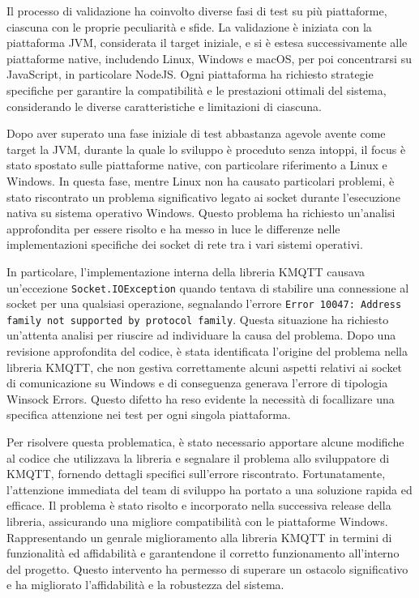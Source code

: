 \documentclass[12pt,a4paper,openright,twoside]{book}
\begin{document}
Il processo di validazione ha coinvolto diverse fasi di test su più piattaforme, ciascuna con le proprie peculiarità e sfide. 
La validazione è iniziata con la piattaforma \ac{JVM}, considerata il target iniziale, e si è estesa successivamente alle piattaforme native, 
includendo Linux, Windows e macOS, per poi concentrarsi su JavaScript, in particolare NodeJS. Ogni piattaforma ha richiesto strategie specifiche 
per garantire la compatibilità e le prestazioni ottimali del sistema, considerando le diverse caratteristiche e limitazioni di ciascuna.

Dopo aver superato una fase iniziale di test abbastanza agevole avente come target la \ac{JVM}, durante la quale lo sviluppo è proceduto senza intoppi, 
il focus è stato spostato sulle piattaforme native, con particolare riferimento a Linux e Windows. In questa fase, mentre Linux non ha causato particolari problemi, 
è stato riscontrato un problema significativo legato ai socket durante l'esecuzione nativa su sistema operativo Windows. Questo problema ha richiesto un'analisi 
approfondita per essere risolto e ha messo in luce le differenze nelle implementazioni specifiche dei socket di rete tra i vari sistemi operativi.

In particolare, l'implementazione interna della libreria KMQTT causava un'eccezione \texttt{Socket.IOException} quando tentava di stabilire una connessione 
al socket per una qualsiasi operazione, segnalando l'errore \texttt{Error 10047: Address family not supported by protocol family}. 
Questa situazione ha richiesto un'attenta analisi per riuscire ad individuare la causa del problema. Dopo una revisione approfondita del codice, è stata identificata 
l'origine del problema nella libreria KMQTT, che non gestiva correttamente alcuni aspetti relativi ai socket di comunicazione su Windows e di conseguenza generava l'errore 
di tipologia Winsock Errors. Questo difetto ha reso evidente la necessità di focallizare una specifica attenzione nei test per ogni singola piattaforma.

Per risolvere questa problematica, è stato necessario apportare alcune modifiche al codice che utilizzava la libreria e segnalare il problema allo sviluppatore 
di KMQTT, fornendo dettagli specifici sull'errore riscontrato. Fortunatamente, l'attenzione immediata del team di sviluppo ha portato a una soluzione rapida ed efficace. 
Il problema è stato risolto e incorporato nella successiva release della libreria, assicurando una migliore compatibilità con le piattaforme Windows.
Rappresentando un genrale miglioramento alla libreria KMQTT in termini di funzionalità ed affidabilità e garantendone il corretto funzionamento all'interno del progetto. 
Questo intervento ha permesso di superare un ostacolo significativo e ha migliorato l'affidabilità e la robustezza del sistema.
\end{document}
